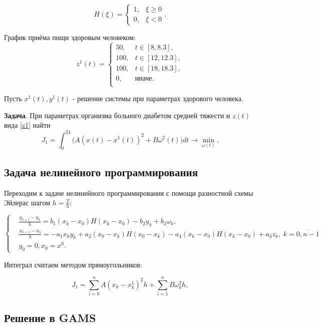 \documentclass[14pt]{article}
\begin{document}
$$
H(\xi) = \begin{cases} 1, & \xi \ge 0 \\ 0, & \xi < 0 \end{cases}.
$$

График приёма пищи здоровым человеком:
\begin{equation}\label{z1}
z^1(t) = \begin{cases}
           50,& t \in [8, 8.3], \\
           100 , & t \in [12, 12.3], \\
           100 , & t \in [18,18.3],\\
           0, & \mbox{иначе}. \\
\end{cases}
\end{equation}

Пусть $ x^1(t), y^1(t) $ - решение системы при параметрах здорового человека.

\textbf{Задача}. При параметрах организма больного диабетом средней тяжести и  $z(t)$ вида \eqref{z1} найти
$$
J_1 = \int_0^{24} \Big( A(x(t)-x^1(t))^2 + B\omega^2(t)\Big) dt \rightarrow \min_{\omega(t)}.
$$

\subsection{Задача нелинейного программирования}

Переходим к задаче нелинейного программирования с помощи разностной схемы Эйлерас шагом $h=\frac{T}{n}$:

\begin{equation}\label{NLP1}
\left\{ \begin{aligned}
& \frac{y_{k+1}-y_k}{h} = b_1(x_k-x_0)H(x_k-x_0) - b_2 y_k+b_{3}\omega_k, \\
& \frac{x_{k+1}-x_k}{h} = - a_{1}x_k y_k+a_2(x_0-x_k)H(x_0-x_k)-a_4(x_k-x_0)H(x_k-x_0)+a_3 z_k,\; k = \overline{0,n-1} \\
& y_0 = 0 , x_0 = x^0.
\end{aligned}\right.
\end{equation}

Интеграл считаем методом прямоугольников:

$$
    J_1 =\sum_{i=0}^n A(x_k-x_k^1)^2 h + \sum_{i=1}^n B\omega_k^2 h,
$$


\subsection{Решение в GAMS}
\end{document}
